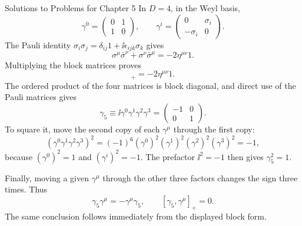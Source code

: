 \begin{bankssolutions}{Solutions to Problems for Chapter 5}
In $D=4$, in the Weyl basis,
\begin{equation*}
 \gamma^0=\begin{pmatrix}0&1\\1&0\end{pmatrix},
 \qquad
 \gamma^i=\begin{pmatrix}0&\sigma_i\\-\sigma_i&0\end{pmatrix}.
\end{equation*}
The Pauli identity
$\sigma_i\sigma_j=\delta_{ij}1+\ii\epsilon_{ijk}\sigma_k$ gives
\begin{equation*}
 \sigma^\mu\bar\sigma^\nu+\sigma^\nu\bar\sigma^\mu
 =-2\eta^{\mu\nu}1.
\end{equation*}
Multiplying the block matrices proves
\begin{equation*}
 [\gamma^\mu,\gamma^\nu]_+=-2\eta^{\mu\nu}1.
\end{equation*}
The ordered product of the four matrices is block diagonal, and direct use of
the Pauli matrices gives
\begin{equation*}
 \gamma_5\equiv\ii\gamma^0\gamma^1\gamma^2\gamma^3
 =\begin{pmatrix}-1&0\\0&1\end{pmatrix}.
\end{equation*}
To square it, move the second copy of each $\gamma^\mu$ through the first copy:
\begin{equation*}
 (\gamma^0\gamma^1\gamma^2\gamma^3)^2
 =(-1)^6(\gamma^0)^2(\gamma^1)^2(\gamma^2)^2(\gamma^3)^2=-1,
\end{equation*}
because $(\gamma^0)^2=1$ and $(\gamma^i)^2=-1$. The prefactor $\ii^2=-1$
then gives $\gamma_5^2=1$.

Finally, moving a given $\gamma^\mu$ through the other three factors changes
the sign three times. Thus
\begin{equation*}
 \gamma_5\gamma^\mu=-\gamma^\mu\gamma_5,
 \qquad [\gamma_5,\gamma^\mu]_+=0.
\end{equation*}
The same conclusion follows immediately from the displayed block form.


\end{bankssolutions}

